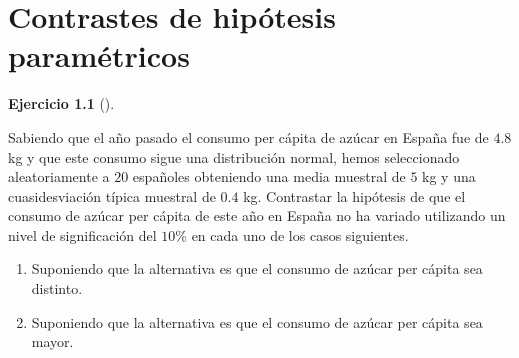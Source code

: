 \documentclass[
  a4paper,
]{scrreport}
\theoremstyle{definition}
\newtheorem{exercise}{Ejercicio}[chapter]
\theoremstyle{remark}
\begin{document}

\chapter{Contrastes de hipótesis
paramétricos}\label{contrastes-de-hipuxf3tesis-paramuxe9tricos}

\begin{exercise}[]\protect\hypertarget{exr-contraste-media-consumo-azucar}{}\label{exr-contraste-media-consumo-azucar}

Sabiendo que el año pasado el consumo per cápita de azúcar en España fue
de \(4.8\) kg y que este consumo sigue una distribución normal, hemos
seleccionado aleatoriamente a \(20\) españoles obteniendo una media
muestral de \(5\) kg y una cuasidesviación típica muestral de \(0.4\)
kg. Contrastar la hipótesis de que el consumo de azúcar per cápita de
este año en España no ha variado utilizando un nivel de significación
del \(10\)\% en cada uno de los casos siguientes.

\begin{enumerate}
\def\labelenumi{\alph{enumi}.}
\item
  Suponiendo que la alternativa es que el consumo de azúcar per cápita
  sea distinto.
\item
  Suponiendo que la alternativa es que el consumo de azúcar per cápita
  sea mayor.
\end{enumerate}

\end{exercise}
\end{document}
